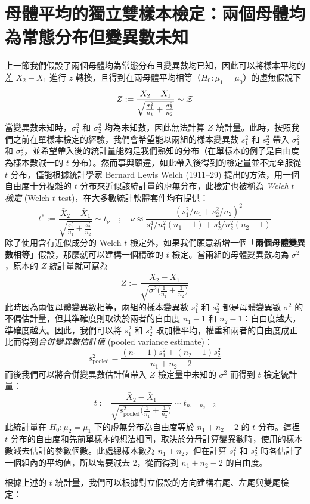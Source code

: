 \section{母體平均的獨立雙樣本檢定：兩個母體均為常態分布但變異數未知}

    上一節我們假設了兩個母體均為常態分布且變異數均已知，因此可以將樣本平均的差 $\bar{X}_2-\bar{X}_1$ 進行 $z$ 轉換，且得到在兩母體平均相等（$H_0: \mu_1 = \mu_0$）的虛無假說下
    \[Z := \frac{\bar{X}_2-\bar{X}_1}{\sqrt{\frac{\sigma_1^2}{n_1} + \frac{\sigma_2^2}{n_2}}} \sim \mathcal{Z}\]
    當變異數未知時，$\sigma_1^2$ 和 $\sigma_2^2$ 均為未知數，因此無法計算 $Z$ 統計量。此時，按照我們之前在單樣本檢定的經驗，我們會希望能以兩組的樣本變異數 $s_1^2$ 和 $s_2^2$ 帶入 $\sigma_1^2$ 和 $\sigma_2^2$，並希望帶入後的統計量能夠是我們熟知的分布（在單樣本的例子是自由度為樣本數減一的 $t$ 分布）。然而事與願違，如此帶入後得到的檢定量並不完全服從 $t$ 分布，僅能根據統計學家 Bernard Lewis Welch (1911–29) 提出的方法，用一個自由度十分複雜的 $t$ 分布來近似該統計量的虛無分布，此檢定也被稱為 \textit{Welch $t$ 檢定} (Welch $t$ test)，在大多數統計軟體套件均有提供：
    \[t^* := \frac{\bar{X}_2-\bar{X}_1}{\sqrt{\frac{s_1^2}{n_1} + \frac{s_2^2}{n_2}}} \sim t_\nu \quad; \quad \nu \approx \frac{(s_1^2/n_1+s_2^2/n_2)^2}{s_1^4/n_1^2(n_1-1) +s_2^4/n_2^2(n_2-1)}\]
    除了使用含有近似成分的 Welch $t$ 檢定外，如果我們願意新增一個「\textbf{兩個母體變異數相等}」假設，那麼就可以建構一個精確的 $t$ 檢定。當兩組的母體變異數均為 $\sigma^2$，原本的 $Z$ 統計量就可寫為
    \[Z := \frac{\bar{X}_2-\bar{X}_1}{\sqrt{\sigma^2\big(\frac{1}{n_1} + \frac{1}{n_2}\big)}}\]
    此時因為兩個母體變異數相等，兩組的樣本變異數 $s_1^2$ 和 $s_2^2$ 都是母體變異數 $\sigma^2$ 的不偏估計量，但其準確度則取決於兩者的自由度 $n_1-1$ 和 $n_2-1$：自由度越大，準確度越大。因此，我們可以將 $s_1^2$ 和 $s_2^2$ 取加權平均，權重和兩者的自由度成正比而得到\textit{合併變異數估計值} (pooled variance estimate)：
    \[s_{\text{pooled}}^2 = \frac{(n_1-1)s_1^2 + (n_2-1)s_2^2}{n_1+n_2-2}\]
    而後我們可以將合併變異數估計值帶入 $Z$ 檢定量中未知的 $\sigma^2$ 而得到 $t$ 檢定統計量：
    \[ t := \frac{\bar{X}_2-\bar{X}_1}{\sqrt{s_{\text{pooled}}^2\big(\frac{1}{n_1} + \frac{1}{n_2}\big)}} \sim t_{n_1+n_2-2}\]    
    此統計量在 $H_0: \mu_2 = \mu_1$ 下的虛無分布為自由度等於 $n_1 + n_2 - 2$ 的 $t$ 分布。這裡 $t$ 分布的自由度和先前單樣本的想法相同，取決於分母計算變異數時，使用的樣本數減去估計的參數個數。此處總樣本數為 $n_1+n_2$，但在計算 $s_1^2$ 和 $s_2^2$ 時各估計了一個組內的平均值，所以需要減去 $2$，從而得到 $n_1 + n_2 - 2$ 的自由度。
    
    根據上述的 $t$ 統計量，我們可以根據對立假設的方向建構右尾、左尾與雙尾檢定：
    
